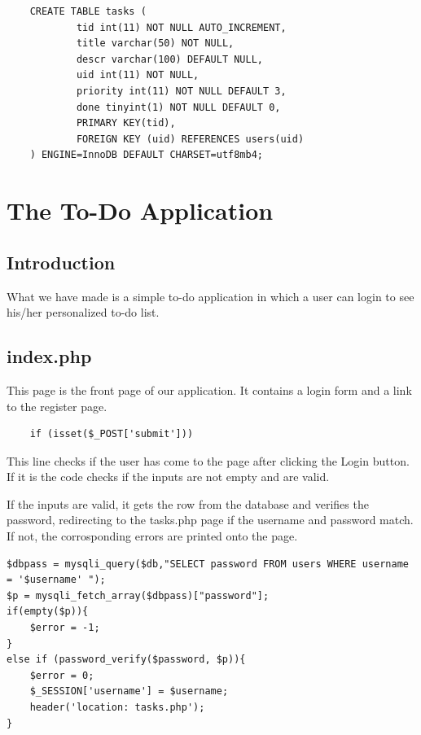 \documentclass[10pt,a4paper,titlepage]{report}
\begin{document}
\begin{verbatim}
	CREATE TABLE tasks (
			tid int(11) NOT NULL AUTO_INCREMENT,
			title varchar(50) NOT NULL,
			descr varchar(100) DEFAULT NULL,
			uid int(11) NOT NULL,
			priority int(11) NOT NULL DEFAULT 3,
			done tinyint(1) NOT NULL DEFAULT 0,
			PRIMARY KEY(tid),
			FOREIGN KEY (uid) REFERENCES users(uid)
	) ENGINE=InnoDB DEFAULT CHARSET=utf8mb4;
\end{verbatim}
\chapter{The To-Do Application}

\section{Introduction}
\par What we have made is a simple to-do application in which a user can login to see his/her personalized to-do list. 

\section{index.php}
\par This page is the front page of our application. It contains a login form and a link to the register page.

\begin{verbatim}
	if (isset($_POST['submit']))
\end{verbatim}

\par This line checks if the user has come to the page after clicking the Login button. If it is the code checks if the inputs are not empty and are valid. 

\par If the inputs are valid, it gets the row from the database and verifies the password, redirecting to the {\color{red}tasks.php} page if the username and password match. If not, the corrosponding errors are printed onto the page.

\begin{verbatim}
$dbpass = mysqli_query($db,"SELECT password FROM users WHERE username = '$username' ");
$p = mysqli_fetch_array($dbpass)["password"];
if(empty($p)){
	$error = -1;
}
else if (password_verify($password, $p)){
	$error = 0;
	$_SESSION['username'] = $username;
	header('location: tasks.php');
}
\end{verbatim}
\end{document}
